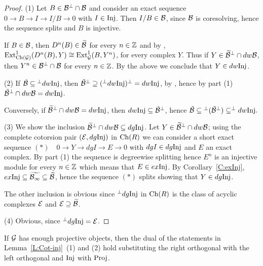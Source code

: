 \begin{proof}
  \begin{sloppypar}
  (1) Let $B\in \mathcal{B}{}^\perp{}\cap \mathcal{B}$ and consider an exact sequence ${0\to B\to I\to I/B\to 0}$ with $I\in \mathrm{Inj}$. Then $I/B\in \mathcal{B}$, since $\mathcal{B}$ is coresolving, hence the sequence splits and $B$ is injective.
\end{sloppypar}

If $B\in \mathcal{B}$, then $D^n(B)\in \widetilde{\mathcal{B}}$ for every $n\in \mathbb{Z}$ and by \cite[Lemma 3.1]{G3}, $\operatorname{Ext}^1_{\mathrm{Ch}(\mathcal{G})}(D^n(B), Y)\cong \operatorname{Ext}^1_{\mathcal{G}}(B, Y^n)$, for every complex $Y$. Thus if $Y\in \widetilde{\mathcal{B}}{}^\perp{}\cap dw \mathcal{B}$, then $Y^n\in \mathcal{B}{}^\perp{}\cap\mathcal{B}$ for every $n\in \mathbb{Z}$. By the above we conclude that $Y\in dw \mathrm{Inj}$.

(2) If $\tilde{\mathcal{B}}\subseteq {}^\perp{} dw\mathrm{Inj}$, then $\tilde{\mathcal{B}}{}^\perp{}\supseteq  ({}^\perp{} dw\mathrm{Inj}){}^\perp{}=dw\mathrm{Inj}$, by \cite[Proposition 4.4]{G4}, hence by part (1) $\tilde{\mathcal{B}}{}^\perp{}\cap dw \mathcal{B}=dw \mathrm{Inj}$.

Conversely, if $\widetilde{\mathcal{B}}{}^\perp{}\cap dw \mathcal{B}=dw \mathrm{Inj}$, then $dw\mathrm{Inj}\subseteq \tilde{\mathcal{B}}^\perp$, hence $\tilde{\mathcal{B}}\subseteq {}^\perp{}(\tilde{\mathcal{B}}{}^\perp{})\subseteq ^\perp{}dw\mathrm{Inj}.$

\begin{sloppypar}
  (3) We show the inclusion $\widetilde{\mathcal{B}}{}^\perp{}\cap dw \mathcal{B}\subseteq dg \mathrm{Inj}$. Let ${Y\in \widetilde{ \mathcal{B}}{}^\perp{}\cap dw \mathcal{B}}$; using the complete cotorsion pair $(\mathcal{E}, dg \mathrm{Inj})$ in $\mathrm{Ch}(R)$ we can consider a  short exact sequence ${(\ast)\quad 0\to Y\to dg I\to E\to 0}$ with $dg I\in dg \mathrm{Inj}$ and $E$ an exact complex. By part (1) the sequence is degreewise splitting hence $E^n$ is an injective module for every $n\in \mathbb{Z}$ which means that $E\in ex \mathrm{Inj}$.
 By  Corollary~\ref{C:exInj}, $ex \mathrm{Inj}\subseteq \widetilde{ \mathcal{B}_{\infty}}\subseteq\widetilde{ \mathcal{B}}$, hence the sequence $(\ast)$ splits showing that $Y\in dg \mathrm{Inj}$.
 \end{sloppypar}

 The other inclusion is  obvious since  ${}^\perp{} dg \mathrm{Inj}$ in $\mathrm{Ch}(R)$ is the class of acyclic complexes $\mathcal{E}$ and $\mathcal{E}\supseteq \widetilde{ \mathcal{B}}$.

 (4) Obvious, since ${}^\perp{} dg \mathrm{Inj}=\mathcal{E}$.  \end{proof}
%
%
%
%
%
%
%
%
%
\begin{rem} If  $\mathcal{G}$ has enough projective objects, then the dual of the statements in Lemma~\ref{L:Cot-inj}~(1) and (2) hold  substituting the right orthogonal with the left orthogonal and $\mathrm{Inj}$ with $\mathrm{Proj}$.
\end{rem}

